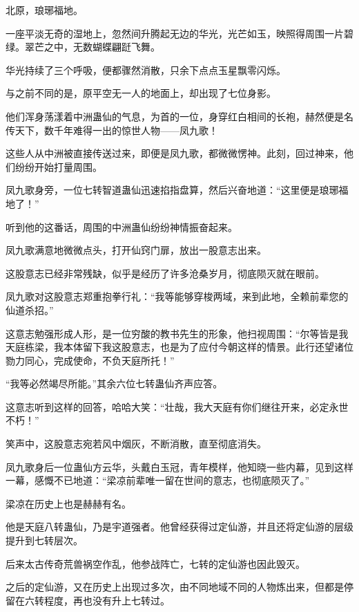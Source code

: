 
\begin{this_body}

北原，琅琊福地。

一座平淡无奇的湿地上，忽然间升腾起无边的华光，光芒如玉，映照得周围一片碧绿。翠芒之中，无数蝴蝶翩跹飞舞。

华光持续了三个呼吸，便都骤然消散，只余下点点玉星飘零闪烁。

与之前不同的是，原平空无一人的地面上，却出现了七位身影。

他们浑身荡漾着中洲蛊仙的气息，为首的一位，身穿红白相间的长袍，赫然便是名传天下，数千年难得一出的惊世人物——凤九歌！

这些人从中洲被直接传送过来，即便是凤九歌，都微微愣神。此刻，回过神来，他们纷纷开始打量周围。

凤九歌身旁，一位七转智道蛊仙迅速掐指盘算，然后兴奋地道：“这里便是琅琊福地了！”

听到他的这番话，周围的中洲蛊仙纷纷神情振奋起来。

凤九歌满意地微微点头，打开仙窍门扉，放出一股意志出来。

这股意志已经非常残缺，似乎是经历了许多沧桑岁月，彻底陨灭就在眼前。

凤九歌对这股意志郑重抱拳行礼：“我等能够穿梭两域，来到此地，全赖前辈您的仙道杀招。”

这意志勉强形成人形，是一位穷酸的教书先生的形象，他扫视周围：“尔等皆是我天庭栋梁，我本体留下我这股意志，也是为了应付今朝这样的情景。此行还望诸位勠力同心，完成使命，不负天庭所托！”

“我等必然竭尽所能。”其余六位七转蛊仙齐声应答。

这意志听到这样的回答，哈哈大笑：“壮哉，我大天庭有你们继往开来，必定永世不朽！”

笑声中，这股意志宛若风中烟灰，不断消散，直至彻底消失。

凤九歌身后一位蛊仙方云华，头戴白玉冠，青年模样，他知晓一些内幕，见到这样一幕，感慨不已地道：“梁凉前辈唯一留在世间的意志，也彻底陨灭了。”

梁凉在历史上也是赫赫有名。

他是天庭八转蛊仙，乃是宇道强者。他曾经获得过定仙游，并且还将定仙游的层级提升到七转层次。

后来太古传奇荒兽祸空作乱，他参战阵亡，七转的定仙游也因此毁灭。

之后的定仙游，又在历史上出现过多次，由不同地域不同的人物炼出来，但都是停留在六转程度，再也没有升上七转过。


\end{this_body}
